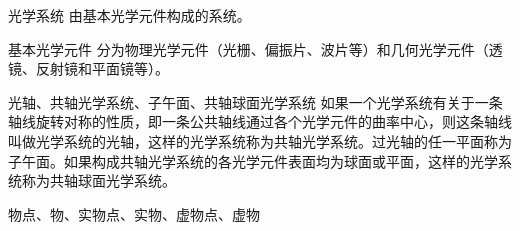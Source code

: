 
\begin{definition}{光学系统}
由基本光学元件构成的系统。
\end{definition}

\begin{definition}{基本光学元件}
分为物理光学元件（光栅、偏振片、波片等）和几何光学元件（透镜、反射镜和平面镜等）。
\end{definition}

\begin{definition}{光轴、共轴光学系统、子午面、共轴球面光学系统}
如果一个光学系统有关于一条轴线旋转对称的性质，即一条公共轴线通过各个光学元件的曲率中心，则这条轴线叫做光学系统的光轴，这样的光学系统称为共轴光学系统。过光轴的任一平面称为子午面。如果构成共轴光学系统的各光学元件表面均为球面或平面，这样的光学系统称为共轴球面光学系统。
\end{definition}

\begin{definition}{物点、物、实物点、实物、虚物点、虚物}

\end{definition}

